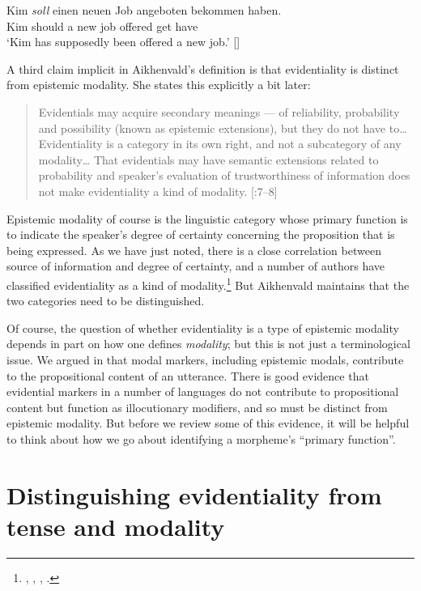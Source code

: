 \ea
\gll Kim  \textit{soll}  einen  neuen  Job  angeboten  bekommen  haben.\\
Kim  should a  new  job  offered  get  have\\
\glt ‘Kim has supposedly been offered a new job.’  [\citealt{vonFintel2006}]
\z


A third claim implicit in Aikhenvald’s definition is that evidentiality is distinct from epistemic modality. She states this explicitly a bit later:


\begin{quote}
Evidentials may acquire secondary meanings — of reliability, probability and possibility (known as epistemic extensions), but they do not have to… Evidentiality is a category in its own right, and not a subcategory of any modality… That evidentials may have semantic extensions related to probability and speaker’s evaluation of trustworthiness of information does not make evidentiality a kind of modality. [\citealt{Aikhenvald2004}:7–8]
\end{quote}


Epistemic modality of course is the linguistic category whose primary function is to indicate the speaker’s degree of certainty concerning the proposition that is being expressed. As we have just noted, there is a close correlation between source of information and degree of certainty, and a number of authors have classified evidentiality as a kind of modality.\footnote{\citet{Palmer1986}, \citet{Frawley1992}, \citet{MatthewsonEtAl2007}, \citet{Izvorski1997}.} But Aikhenvald maintains that the two categories need to be distinguished. 



Of course, the question of whether evidentiality is a type of epistemic modality depends in part on how one defines \textit{modality}; but this is not just a terminological issue. We argued in  that modal markers, including epistemic modals, contribute to the propositional content of an utterance. There is good evidence that evidential markers in a number of languages do not contribute to propositional content but function as illocutionary modifiers, and so must be distinct from epistemic modality. But before we review some of this evidence, it will be helpful to think about how we go about identifying a morpheme’s “primary function”.


\section{Distinguishing evidentiality from tense and modality}\label{sec:17.4}

